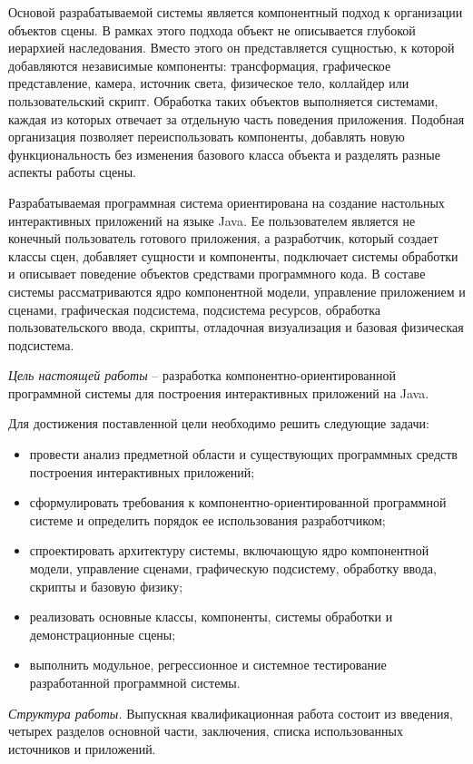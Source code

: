 Основой разрабатываемой системы является компонентный подход к организации объектов сцены. В рамках этого подхода объект не описывается глубокой иерархией наследования. Вместо этого он представляется сущностью, к которой добавляются независимые компоненты: трансформация, графическое представление, камера, источник света, физическое тело, коллайдер или пользовательский скрипт. Обработка таких объектов выполняется системами, каждая из которых отвечает за отдельную часть поведения приложения. Подобная организация позволяет переиспользовать компоненты, добавлять новую функциональность без изменения базового класса объекта и разделять разные аспекты работы сцены.

Разрабатываемая программная система ориентирована на создание настольных интерактивных приложений на языке Java. Ее пользователем является не конечный пользователь готового приложения, а разработчик, который создает классы сцен, добавляет сущности и компоненты, подключает системы обработки и описывает поведение объектов средствами программного кода. В составе системы рассматриваются ядро компонентной модели, управление приложением и сценами, графическая подсистема, подсистема ресурсов, обработка пользовательского ввода, скрипты, отладочная визуализация и базовая физическая подсистема.

\emph{Цель настоящей работы} -- разработка компонентно-ориентированной программной системы для построения интерактивных приложений на Java.

Для достижения поставленной цели необходимо решить следующие задачи:
\begin{itemize}
\item провести анализ предметной области и существующих программных средств построения интерактивных приложений;
\item сформулировать требования к компонентно-ориентированной программной системе и определить порядок ее использования разработчиком;
\item спроектировать архитектуру системы, включающую ядро компонентной модели, управление сценами, графическую подсистему, обработку ввода, скрипты и базовую физику;
\item реализовать основные классы, компоненты, системы обработки и демонстрационные сцены;
\item выполнить модульное, регрессионное и системное тестирование разработанной программной системы.
\end{itemize}

\emph{Структура работы.} Выпускная квалификационная работа состоит из введения, четырех разделов основной части, заключения, списка использованных источников и приложений.

